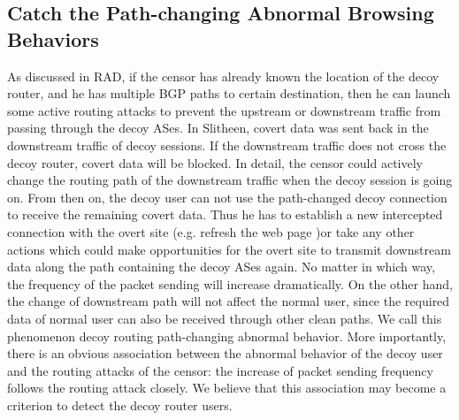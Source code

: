 \documentclass[conference]{IEEEtran}
\begin{document}
\subsection{Catch the Path-changing Abnormal Browsing Behaviors }
As discussed in RAD, if the censor has already known the location of the decoy router, and he has multiple BGP paths to certain destination, then he can launch some active routing attacks to prevent the upstream or downstream traffic from passing through the decoy ASes. In Slitheen, covert data was sent back in the downstream traffic of decoy sessions. If the downstream traffic does not cross the decoy router, covert data will be blocked. In detail, the censor could actively change the routing path of the  downstream traffic when the decoy session is going on. From then on, the decoy user can not use the path-changed decoy connection to receive the remaining covert data. Thus he has to establish a new intercepted connection with the overt site (e.g. refresh the web page )or take any other actions which could make opportunities for the overt site to transmit downstream data along the path containing the decoy ASes again. No matter in which way, the frequency of the packet sending will increase dramatically. On the other hand, the change of downstream path will not affect the normal user, since the required data of normal user can also be received through other clean paths. We call this phenomenon decoy routing path-changing abnormal behavior. More importantly, there is an obvious association between the abnormal behavior of the decoy user and the routing attacks of the censor: the increase of packet sending frequency follows the routing attack closely. We believe that this association may become a criterion to detect the decoy router users. 
\end{document}
